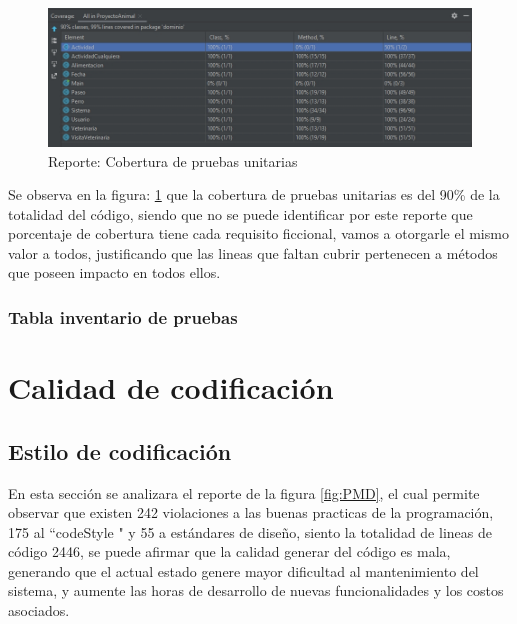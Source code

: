 \begin{figure}
    \centering
    \includegraphics[scale =1.8]{Files/coverturaUnitTests.jpg}
    \caption{Reporte: Cobertura de pruebas unitarias}
    \label{fig:pruebasUnitarias}
\end{figure}
Se observa en la figura: \ref{fig:pruebasUnitarias} que la cobertura de pruebas unitarias es del 90\% de la totalidad del código, siendo que no se puede identificar por este reporte que porcentaje de cobertura tiene cada requisito ficcional, vamos a otorgarle el mismo valor a todos, justificando que las lineas que faltan cubrir pertenecen a métodos que poseen impacto en todos ellos.


\subsubsection{Tabla inventario de pruebas}

\section{Calidad de codificación}

\subsection{Estilo de codificación}
En esta sección se analizara el reporte de la figura \ref{fig:PMD}, el cual permite observar que existen 242 violaciones a las buenas practicas de la programación, 175 al ``codeStyle " y 55 a estándares de diseño, siento la totalidad de lineas de código 2446, se puede afirmar que la calidad generar del código es mala, generando que el actual estado genere mayor dificultad al mantenimiento del sistema, y aumente las horas de desarrollo de nuevas funcionalidades y los costos asociados.



